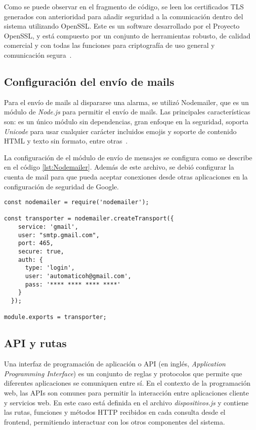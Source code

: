 Como se puede observar en el fragmento de código, se leen los certificados TLS generados con anterioridad para añadir seguridad a la comunicación dentro del sistema utilizando OpenSSL. Este es un software desarrollado por el Proyecto OpenSSL, y está compuesto por un conjunto de herramientas robusto, de calidad comercial y con todas las funciones para criptografía de uso general y comunicación segura\ \citep{34}.

\subsection{Configuración del envío de mails}

Para el envío de mails al dispararse una alarma, se utilizó Nodemailer, que es un módulo de \textit{Node.js} para permitir el envío de mails. Las principales características son: es un único módulo sin dependencias, gran enfoque en la seguridad, soporta \textit{Unicode} para usar cualquier carácter incluidos emojis y soporte de contenido HTML y texto sin formato, entre otras\ \citep{35}.

La configuración de el módulo de envío de mensajes se configura como se describe en el código \ref{lst:Nodemailer}. Además de este archivo, se debió configurar la cuenta de mail para que pueda aceptar conexiones desde otras aplicaciones en la configuración de seguridad de Google.

\begin{lstlisting}[caption={Configuración del módulo de envío de mails.}, label={lst:Nodemailer}]
const nodemailer = require('nodemailer');

const transporter = nodemailer.createTransport({
    service: 'gmail',
    user: "smtp.gmail.com",
    port: 465,
    secure: true,
    auth: {
      type: 'login',
      user: 'automaticoh@gmail.com',
      pass: '**** **** **** ****'
    }
  });

module.exports = transporter;
\end{lstlisting}

\subsection{API y rutas}

Una interfaz de programación de aplicación o API (en inglés, \textit{Application Programming Interface}) es un conjunto de reglas y protocolos que permite que diferentes aplicaciones se comuniquen entre sí. En el contexto de la programación web, las APIs son comunes para permitir la interacción entre aplicaciones cliente y servicios web. En este caso está definida en el archivo \textit{dispositivos.js} y contiene las rutas, funciones y métodos HTTP recibidos en cada consulta desde el frontend, permitiendo interactuar con los otros componentes del sistema.

